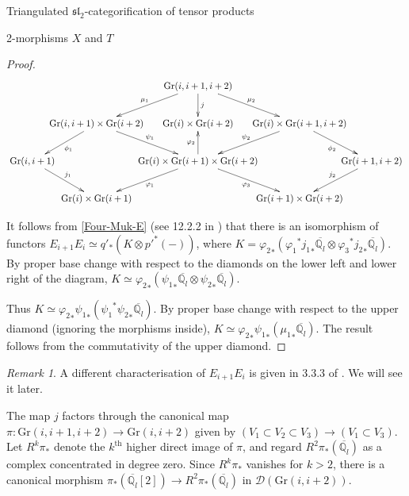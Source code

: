 \documentclass[12pt]{amsart}
\theoremstyle{definition}
\theoremstyle{remark}
\newtheorem{rmk}[thm]{Remark}
\theoremstyle{remark}
\begin{document}
\begin{section}{Triangulated $\mathfrak{sl}_{2}$-categorification of tensor products}
\begin{subsection}{2-morphisms $X$ and $T$}
\begin{proof}
 \[ \xymatrix @C-3pc {& & \text{Gr}(i,i+1,i+2) \ar[d]^{j} \ar[dl]_{\mu_{1}} \ar[dr]^{\mu_{2}} & & \\ & \text{Gr}(i,i+1) \times \text{Gr}(i+2) \ar[dl]^{\phi_{1}} \ar[dr]^{\psi_{1}} & \text{Gr}(i) \times \text{Gr}(i+2) & \text{Gr}(i) \times \text{Gr}(i+1,i+2) \ar[dl]_{\psi_{2}} \ar[dr]_{\phi_{2}} & \\ \text{Gr}(i,i+1) \ar[dr]^{j_{1}} & & \text{Gr}(i) \times \text{Gr}(i+1) \times \text{Gr}(i+2) \ar[dl]^{\varphi_{1}} \ar[u]^{\varphi_{2}} \ar[dr]_{\varphi_{3}} & & \text{Gr}(i+1,i+2) \ar[dl]_{j_{2}} \\ & \text{Gr}(i) \times \text{Gr}(i+1) &  & \text{Gr}(i+1) \times \text{Gr}(i+2) & } \] 

It follows from \ref{Four-Muk-E} (see 12.2.2 in \cite{RouquierCategorificationSl2BraidGroups}) that there is an isomorphism of functors $E_{i+1}E_{i} \simeq q'_{*}(K \otimes p'^{*}(-))$, where $K = {\varphi_{2}}_{*}({\varphi_{1}}^{*} {j_{1}}_{*} \overline{\mathbb{Q}_{l}} \otimes {\varphi_{3}}^{*} {j_{2}}_{*} \overline{\mathbb{Q}_{l}})$. By proper base change with respect to the diamonds on the lower left and lower right of the diagram, $K \simeq {\varphi_{2}}_{*}({\psi_{1}}_{*} \overline{\mathbb{Q}_{l}} \otimes {\psi_{2}}_{*} \overline{\mathbb{Q}_{l}} )$. 

Thus $K \simeq {\varphi_{2}}_{*}{\psi_{1}}_{*} ({\psi_{1}}^{*}{\psi_{2}}_{*}\overline{\mathbb{Q}_{l}})$. By proper base change with respect to the upper diamond (ignoring the morphisms inside), $K \simeq {\varphi_{2}}_{*}{\psi_{1}}_{*} ({\mu_{1}}_{*}\overline{\mathbb{Q}_{l}})$. The result follows from the commutativity of the upper diamond.   
\end{proof}

\begin{rmk} A different characterisation of $E_{i+1}E_{i}$ is given in 3.3.3 of \cite{ZhengGeometricCategorificationTensorProducts}. We will see it later. \end{rmk}

The map $j$ factors through the canonical map $\pi \colon \text{Gr}(i,i+1,i+2) \rightarrow \text{Gr}(i,i+2)$ given by $(V_{1} \subset V_{2} \subset V_{3}) \rightarrow (V_{1} \subset V_{3})$. Let $R^{k}\pi_{*}$ denote the $k^{\text{th}}$ higher direct image of $\pi$, and regard $R^{2}\pi_{*}(\overline{\mathbb{Q}_{l}})$ as a complex concentrated in degree zero. Since $R^{k}\pi_{*}$ vanishes for $k > 2$, there is a canonical morphism $\pi_{*}(\overline{\mathbb{Q}_{l}}[2]) \rightarrow R^{2}\pi_{*}(\overline{\mathbb{Q}_{l}})$ in $\mathcal{D}(\text{Gr}(i,i+2))$.


\end{subsection}
\end{section}
\end{document}
